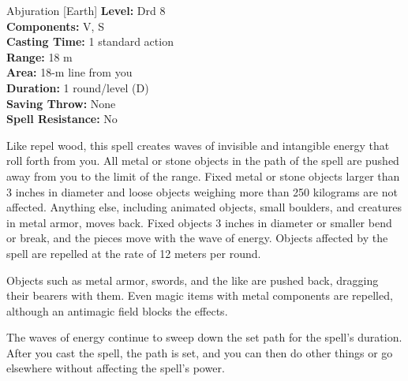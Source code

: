 {Abjuration [Earth]}
{
	\textbf{Level:}
	Drd 8\\
	\textbf{Components:}
	V, S\\
	\textbf{Casting Time:}
	1 standard action\\
	\textbf{Range:}
	18 m\\
	\textbf{Area:}
	18-m line from you\\
	\textbf{Duration:}
	1 round/level (D)\\
	\textbf{Saving Throw:}
	None\\
	\textbf{Spell Resistance:}
	No\\
}
{
	Like repel wood, this spell creates waves of invisible and intangible energy that roll forth from you. All metal or stone objects in the path of the spell are pushed away from you to the limit of the range. Fixed metal or stone objects larger than 3 inches in diameter and loose objects weighing more than 250 kilograms are not affected. Anything else, including animated objects, small boulders, and creatures in metal armor, moves back. Fixed objects 3 inches in diameter or smaller bend or break, and the pieces move with the wave of energy. Objects affected by the spell are repelled at the rate of 12 meters per round.

	Objects such as metal armor, swords, and the like are pushed back, dragging their bearers with them. Even magic items with metal components are repelled, although an antimagic field blocks the effects.

	The waves of energy continue to sweep down the set path for the spell's duration. After you cast the spell, the path is set, and you can then do other things or go elsewhere without affecting the spell's power.

}
